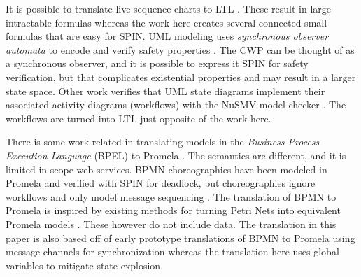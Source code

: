 It is possible to translate live sequence charts to LTL \cite{KUMAR, KUMAR2009137}. These result in large intractable formulas whereas the work here creates several connected small formulas that are easy for SPIN. UML modeling uses \emph{synchronous observer automata} to encode and verify safety properties \cite{8906967}. The CWP can be thought of as a synchronous observer, and it is possible to express it SPIN for safety verification, but that complicates existential properties and may result in a larger state space. Other work verifies that UML state diagrams implement their associated activity diagrams (workflows) with the NuSMV model checker \cite{7436156}. The workflows are turned into LTL just opposite of the work here.

There is some work related in translating models in the \emph{Business Process Execution Language} (BPEL) to Promela \cite{bpelToPromela}. The semantics are different, and it is limited in scope web-services. BPMN choreographies have been modeled in Promela and verified with SPIN for deadlock, but choreographies ignore workflows and only model message sequencing \cite{choreography}. The translation of BPMN to Promela is inspired by existing methods for turning Petri Nets into equivalent Promela models \cite{petrinetToPromela, petrinetInspiration}. These however do not include data. The translation in this paper is also based off of early prototype translations of BPMN to Promela using message channels for synchronization \cite{bpmn2promela} whereas the translation here uses global variables to mitigate state explosion.